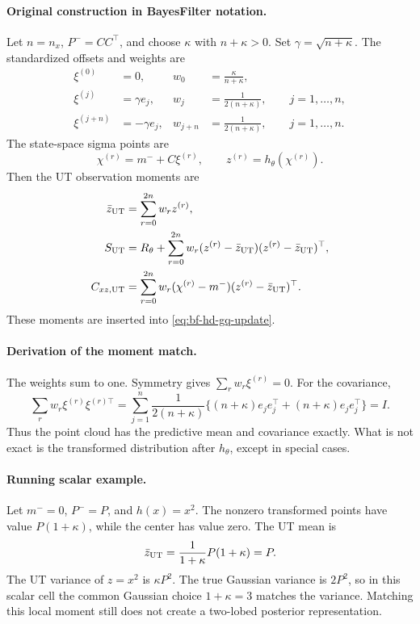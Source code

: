 \paragraph{Original construction in BayesFilter notation.}
Let \(n=n_x\), \(P^-=CC^\top\), and choose \(\kappa\) with \(n+\kappa>0\).
Set \(\gamma=\sqrt{n+\kappa}\).  The standardized offsets and weights are
\begin{align}
  \xi^{(0)}&=0,&
  w_0&=\frac{\kappa}{n+\kappa},\\
  \xi^{(j)}&=\gamma e_j,&
  w_j&=\frac{1}{2(n+\kappa)},\qquad j=1,\ldots,n,\\
  \xi^{(j+n)}&=-\gamma e_j,&
  w_{j+n}&=\frac{1}{2(n+\kappa)},\qquad j=1,\ldots,n.
  \label{eq:bf-hd-ut-points}
\end{align}
The state-space sigma points are
\[
  \chi^{(r)}=m^-+C\xi^{(r)},\qquad
  z^{(r)}=h_\theta(\chi^{(r)}).
\]
Then the UT observation moments are
\begin{align}
  \bar z_{\rm UT}&=\sum_{r=0}^{2n}w_rz^{(r)},\\
  S_{\rm UT}&=R_\theta+
    \sum_{r=0}^{2n}w_r(z^{(r)}-\bar z_{\rm UT})
      (z^{(r)}-\bar z_{\rm UT})^\top,\\
  C_{xz,{\rm UT}}&=
    \sum_{r=0}^{2n}w_r(\chi^{(r)}-m^-)
      (z^{(r)}-\bar z_{\rm UT})^\top .
  \label{eq:bf-hd-ut-moments}
\end{align}
These moments are inserted into \eqref{eq:bf-hd-gq-update}.

\paragraph{Derivation of the moment match.}
The weights sum to one.  Symmetry gives \(\sum_rw_r\xi^{(r)}=0\).  For the
covariance,
\[
  \sum_rw_r\xi^{(r)}\xi^{(r)\top}
  =
  \sum_{j=1}^n
  \frac{1}{2(n+\kappa)}
  \{(n+\kappa)e_je_j^\top+(n+\kappa)e_je_j^\top\}
  =I .
\]
Thus the point cloud has the predictive mean and covariance exactly.  What is
not exact is the transformed distribution after \(h_\theta\), except in special
cases.

\paragraph{Running scalar example.}
Let \(m^-=0\), \(P^-=P\), and \(h(x)=x^2\).  The nonzero transformed points have
value \(P(1+\kappa)\), while the center has value zero.  The UT mean is
\[
  \bar z_{\rm UT}
  =
  \frac{1}{1+\kappa}P(1+\kappa)=P.
\]
The UT variance of \(z=x^2\) is \(\kappa P^2\).  The true Gaussian variance is
\(2P^2\), so in this scalar cell the common Gaussian choice \(1+\kappa=3\)
matches the variance.  Matching this local moment still does not create a
two-lobed posterior representation.

